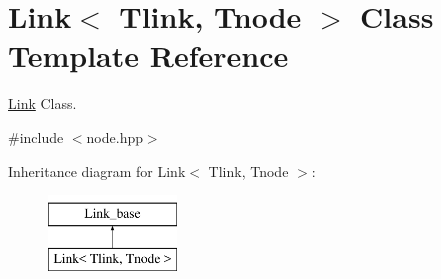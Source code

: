 \hypertarget{classLink}{\section{Link$<$ Tlink, Tnode $>$ Class Template Reference}
\label{classLink}
}


\hyperlink{classLink}{Link} Class.  




{\ttfamily \#include $<$node.\+hpp$>$}

Inheritance diagram for Link$<$ Tlink, Tnode $>$\+:\begin{figure}[H]
\begin{center}
\leavevmode
\includegraphics[height=2.000000cm]{classLink}
\end{center}
\end{figure}
